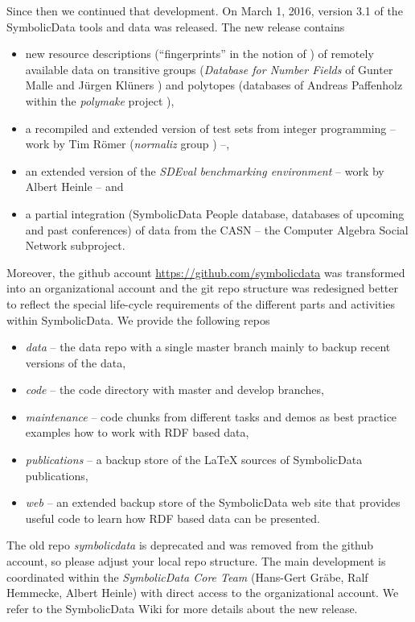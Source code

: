 \documentclass{llncs}
\newcommand{\SD}{{\sc Symbo\-lic\-Data}}
\begin{document}
Since then we continued that development.  On March 1, 2016, version 3.1 of
the {\SD} tools and data was released. The new release contains
\begin{itemize}
\item new resource descriptions (``fingerprints'' in the notion of
  \cite{cicm-14}) of remotely available data on transitive groups
  (\emph{Database for Number Fields} of Gunter Malle and J\"urgen Kl\"uners
  \cite{MalleKlueners}) and polytopes (databases of Andreas Paffenholz
  \cite{Paffenholz} within the \emph{polymake} project \cite{polymake}),
\item a recompiled and extended version of test sets from integer programming
  -- work by Tim R\"omer (\emph{normaliz} group \cite{normaliz}) --, 
\item an extended version of the \emph{SDEval benchmarking environment} -- work
  by Albert Heinle \cite{heinle-15} -- and
\item a partial integration ({\SD} People database, databases of upcoming and
  past conferences) of data from the CASN -- the Computer Algebra Social
  Network subproject.
\end{itemize}
Moreover, the github account \url{https://github.com/symbolicdata} was
transformed into an organizational account and the git repo structure was
redesigned better to reflect the special life-cycle requirements of the
different parts and activities within {\SD}. We provide the following repos
\begin{itemize}
\item \emph{data} -- the data repo with a single master branch mainly to backup
  recent versions of the data,
\item \emph{code} -- the code directory with master and develop branches,
\item \emph{maintenance} -- code chunks from different tasks and demos as best
  practice examples how to work with RDF based data,
\item \emph{publications} -- a backup store of the {\LaTeX} sources of {\SD}
  publications, 
\item \emph{web} -- an extended backup store of the {\SD} web site that
  provides useful code to learn how RDF based data can be presented.
\end{itemize}
The old repo \emph{symbolicdata} is deprecated and was removed from the github
account, so please adjust your local repo structure. The main development is
coordinated within the \emph{{\SD} Core Team} (Hans-Gert Gr\"abe, Ralf
Hemmecke, Albert Heinle) with direct access to the organizational account.  We
refer to the {\SD} Wiki \cite{sdwiki} for more details about the new release. 
\medskip
\end{document}
